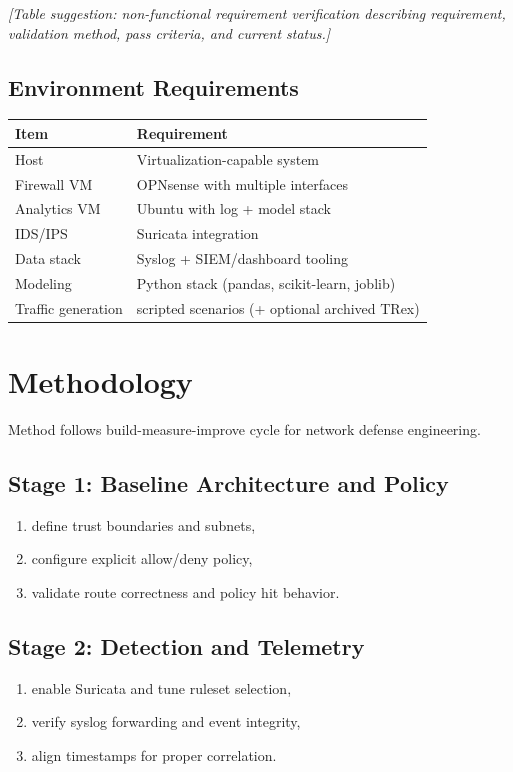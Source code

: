 \documentclass[12pt,a4paper]{article}
\begin{document}
\textit{[Table suggestion: non-functional requirement verification describing requirement, validation method, pass criteria, and current status.]}

\subsection{Environment Requirements}

\begin{table}[h!]
\centering
\begin{tabular}{ll}
\toprule
Item & Requirement \\
\midrule
Host & Virtualization-capable system \\
Firewall VM & OPNsense with multiple interfaces \\
Analytics VM & Ubuntu with log + model stack \\
IDS/IPS & Suricata integration \\
Data stack & Syslog + SIEM/dashboard tooling \\
Modeling & Python stack (pandas, scikit-learn, joblib) \\
Traffic generation & scripted scenarios (+ optional archived TRex) \\
\bottomrule
\end{tabular}
\end{table}

\section{Methodology}

Method follows build-measure-improve cycle for network defense engineering.

\subsection{Stage 1: Baseline Architecture and Policy}
\begin{enumerate}
    \item define trust boundaries and subnets,
    \item configure explicit allow/deny policy,
    \item validate route correctness and policy hit behavior.
\end{enumerate}

\subsection{Stage 2: Detection and Telemetry}
\begin{enumerate}
    \item enable Suricata and tune ruleset selection,
    \item verify syslog forwarding and event integrity,
    \item align timestamps for proper correlation.
\end{enumerate}
\end{document}
